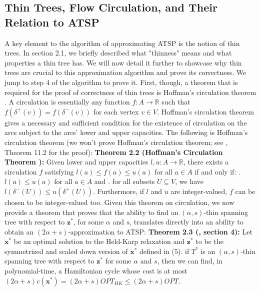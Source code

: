 \documentclass[oneside]{projectpaper} %
\begin{document}
\subsection{Thin Trees, Flow Circulation, and Their Relation to ATSP}
A key element to the algorithm of approximating ATSP is the notion of thin trees. In section 2.1, we briefly described what "thinness" means and what properties a thin tree has. We will now detail it further to showcase why thin trees are crucial to this approximation algorithm and prove its correctness. \newline
\indent We jump to step 4 of the algorithm to prove it. First, though, a theorem that is required for the proof of correctness of thin trees is Hoffman's circulation theorem \cite{Sch03}. A circulation is essentially any function $f : A \rightarrow \mathbb{R}$ such that $f(\delta^+(v)) = f(\delta^-(v))$ for each vertex $v \in V$. Hoffman's circulation theorem gives a necessary and sufficient condition for the existence of circulation on the arcs subject to the arcs' lower and upper capacities. The following is Hoffman's circulation theorem (we won't prove Hoffman's circulation theorem; see \cite{Sch03}, Theorem 11.2 for the proof):
\newline
\newline
\textbf{Theorem 2.2 (Hoffman's Circulation Theorem \cite{Sch03}):} Given lower and upper capacities $l, u : A \rightarrow \mathbb{R}$, there exists a circulation $f$ satisfying $l(a) \leq f(a) \leq u(a)$ for all $a \in A$ if and only if:
\newline {}. $l(a) \leq u(a)$ for all $a \in A$ and
\newline {}. for all subsets $U \subseteq V$, we have $l(\delta^-(U)) \leq u(\delta^+(U))$.
\newline Furthermore, if $l$ and $u$ are integer-valued, $f$ can be chosen to be integer-valued too.
\newline
\newline
Given this theorem on circulation, we now provide a theorem that proves that the ability to find an $(\alpha, s)$-thin spanning tree with respect to $\textbf{z}^*$, for some $\alpha$ and $s$, translates directly into an ability to obtain an $(2\alpha + s)$-approximation to ATSP:
\newline
\newline
\textbf{Theorem 2.3 (\cite{AGM10}, section 4):} Let $\textbf{x}^*$ be an optimal solution to the Held-Karp relaxation and $\textbf{z}^*$ to be the symmetrized and scaled down version of $\textbf{x}^*$ defined in (5). if $T^*$ is an $(\alpha, s)$-thin spanning tree with respect to $\textbf{z}^*$ for some $\alpha$ and $s$, then we can find, in polynomial-time, a Hamiltonian cycle whose cost is at most $(2\alpha + s)c(\textbf{x}^*) = (2\alpha + s)OPT_{HK} \leq (2\alpha + s)OPT$.
\end{document}
